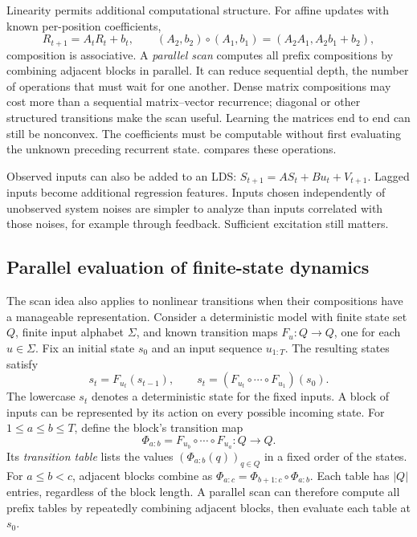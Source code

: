 \documentclass[11pt,twoside]{article}
\theoremstyle{definition}
\theoremstyle{remark}
\begin{document}
Linearity permits additional computational structure.
For affine updates with known per-position coefficients,
\[
 R_{t+1}=A_tR_t+b_t,\qquad
 (A_2,b_2)\circ(A_1,b_1)=(A_2A_1,A_2b_1+b_2),
\]
composition is associative. A \emph{parallel scan} computes all prefix
compositions by combining adjacent blocks in parallel. It can reduce
sequential depth, the number of operations that must wait for one another.
Dense matrix compositions may cost more than a sequential matrix--vector
recurrence; diagonal or other structured transitions make the scan useful.
Learning the matrices end to end can still be nonconvex.
The coefficients must be computable without first evaluating the unknown
preceding recurrent state.  compares these operations.

Observed inputs can also be added to an LDS:
\(S_{t+1}=AS_t+Bu_t+V_{t+1}\).
Lagged inputs become additional regression features. Inputs chosen
independently of unobserved system noises are simpler to analyze than
inputs correlated with those noises, for example through feedback.
Sufficient excitation still matters.

\subsection{Parallel evaluation of finite-state dynamics}
\label{sec:finite-state-scan}

The scan idea also applies to nonlinear transitions when their compositions
have a manageable representation. Consider a deterministic model with finite
state set \(Q\), finite input alphabet \(\Sigma\), and known transition maps
\(F_u:Q\to Q\), one for each \(u\in\Sigma\). Fix an initial state \(s_0\)
and an input sequence \(u_{1:T}\). The resulting states satisfy
\[
 s_t=F_{u_t}(s_{t-1}),\qquad
 s_t=(F_{u_t}\circ\cdots\circ F_{u_1})(s_0).
\]
The lowercase \(s_t\) denotes a deterministic state for the fixed inputs.
A block of inputs can be represented by its action on every possible
incoming state. For \(1\leq a\leq b\leq T\), define the block's transition map
\[
 \Phi_{a:b}=F_{u_b}\circ\cdots\circ F_{u_a}:Q\to Q.
\]
Its \emph{transition table} lists the values
\((\Phi_{a:b}(q))_{q\in Q}\) in a fixed order of the states.
For \(a\leq b<c\), adjacent blocks combine as
\(\Phi_{a:c}=\Phi_{b+1:c}\circ\Phi_{a:b}\).
Each table has \(|Q|\) entries, regardless of the block length.
A parallel scan can therefore compute all prefix tables by repeatedly
combining adjacent blocks, then evaluate each table at \(s_0\).
\end{document}
